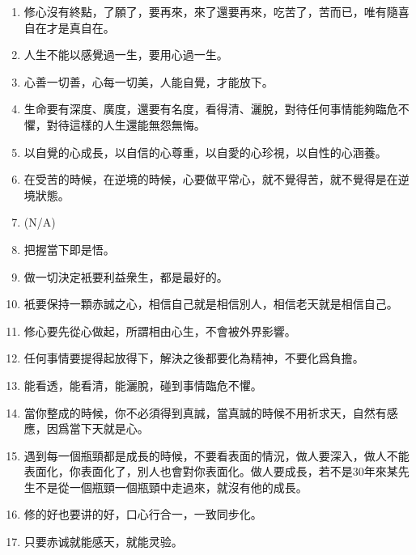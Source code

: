 \documentclass{article}
\newcommand{\hei}{\CJKfamily{hei}}
\begin{document}
\thispagestyle{empty}
\begin{center}
    \hei{\Huge 修心十七条}
\end{center}
\hfill

\large\selectfont
\begin{enumerate}
\item 修心沒有終點，了願了，要再來，來了還要再來，吃苦了，苦而已，唯有隨喜自在才是真自在。
\item 人生不能以感覺過一生，要用心過一生。
\item 心善一切善，心每一切美，人能自覺，才能放下。
\item 生命要有深度、廣度，還要有名度，看得清、灑脫，對待任何事情能夠臨危不懼，對待這樣的人生還能無怨無悔。
\item 以自覺的心成長，以自信的心尊重，以自愛的心珍視，以自性的心涵養。
\item 在受苦的時候，在逆境的時候，心要做平常心，就不覺得苦，就不覺得是在逆境狀態。
\item (N/A)
\item 把握當下即是悟。
\item 做一切決定衹要利益衆生，都是最好的。
\item 衹要保持一顆赤誠之心，相信自己就是相信別人，相信老天就是相信自己。
\item 修心要先從心做起，所謂相由心生，不會被外界影響。
\item 任何事情要提得起放得下，解決之後都要化為精神，不要化爲負擔。
\item 能看透，能看清，能灑脫，碰到事情臨危不懼。
\item 當你整成的時候，你不必須得到真誠，當真誠的時候不用祈求天，自然有感應，因爲當下天就是心。
\item 遇到每一個瓶頸都是成長的時候，不要看表面的情況，做人要深入，做人不能表面化，你表面化了，別人也會對你表面化。做人要成長，若不是30年來某先生不是從一個瓶頸一個瓶頸中走過來，就沒有他的成長。
\item 修的好也要讲的好，口心行合一，一致同步化。
\item 只要赤诚就能感天，就能灵验。
\end{enumerate}
\end{document}
